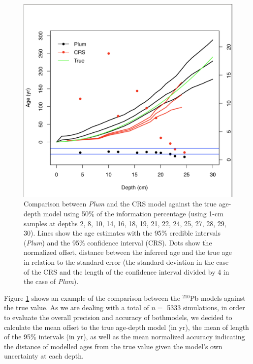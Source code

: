\documentclass [10pt] {article}
\begin{document}
\begin{figure}[!]
	\begin{centering}
		\includegraphics[width=\linewidth]{comparison1.png}
		\caption{Comparison between \textit{Plum} and the CRS model against the true age-depth model using 50\% of the information percentage (using 1-cm samples at depths 2, 8, 10, 14, 16, 18, 19, 21, 22, 24, 25, 27, 28, 29, 30). Lines show the age estimates with the 95\% credible intervals (\textit{Plum}) and the 95\% confidence interval (CRS). Dots show the normalized offset, distance between the inferred age and the true age in relation to the standard error (the standard deviation in the case of the CRS and the length of the confidence interval divided by 4 in the case of \textit{Plum}).    }
		\label{fig:comparison1r}
	\end{centering}
\end{figure}

Figure \ref{fig:comparison1r} shows an example of the comparison between the $^{210}$Pb models against the true value. 
As we are dealing with a total of $n =$ 5333 simulations, in order to evaluate the overall precision and accuracy of bothmodels, we decided to calculate the mean offset to the true age-depth model (in yr), the mean of length of the 95\% intervals (in yr), as well as the mean normalized accuracy indicating the distance of modelled ages from the true value given the model's own uncertainty at each depth.  
\end{document}
